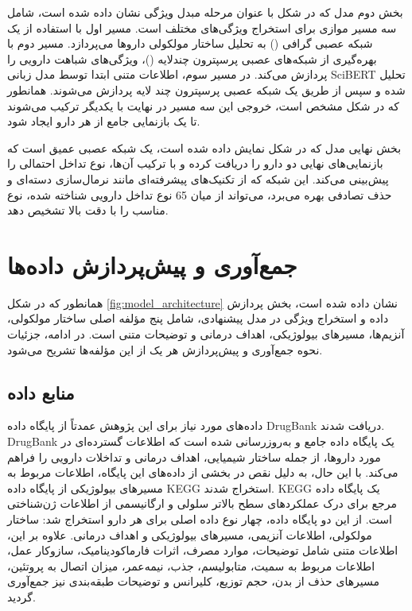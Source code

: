 بخش دوم مدل که در شکل با عنوان مرحله مبدل ویژگی نشان داده شده است، شامل سه مسیر موازی برای استخراج ویژگی‌های مختلف است. مسیر اول با استفاده از یک شبکه عصبی گرافی () به تحلیل ساختار مولکولی داروها می‌پردازد. مسیر دوم با بهره‌گیری از شبکه‌های عصبی پرسپترون چندلایه ()، ویژگی‌های شباهت دارویی را پردازش می‌کند. در مسیر سوم، اطلاعات متنی ابتدا توسط مدل زبانی SciBERT تحلیل شده و سپس از طریق یک شبکه عصبی پرسپترون چند لایه پردازش می‌شوند. همانطور که در شکل مشخص است، خروجی این سه مسیر در نهایت با یکدیگر ترکیب می‌شوند تا یک بازنمایی جامع از هر دارو ایجاد شود.

بخش نهایی مدل که در شکل نمایش داده شده است، یک شبکه عصبی عمیق است که بازنمایی‌های نهایی دو دارو را دریافت کرده و با ترکیب آن‌ها، نوع تداخل احتمالی را پیش‌بینی می‌کند. این شبکه که از تکنیک‌های پیشرفته‌ای مانند نرمال‌سازی دسته‌ای و حذف تصادفی بهره می‌برد، می‌تواند از میان 65 نوع تداخل دارویی شناخته شده، نوع مناسب را با دقت بالا تشخیص دهد.

\section{جمع‌آوری و پیش‌پردازش داده‌ها}

همانطور که در شکل \ref{fig:model_architecture} نشان داده شده است، بخش پردازش داده و استخراج ویژگی در مدل پیشنهادی، شامل پنج مؤلفه اصلی ساختار مولکولی، آنزیم‌ها، مسیرهای بیولوژیکی، اهداف درمانی و توضیحات متنی است. در ادامه، جزئیات نحوه جمع‌آوری و پیش‌پردازش هر یک از این مؤلفه‌ها تشریح می‌شود.

\subsection{منابع داده}

داده‌های مورد نیاز برای این پژوهش عمدتاً از پایگاه داده DrugBank \cite{ref_drugbank} دریافت شدند. DrugBank یک پایگاه داده جامع و به‌روزرسانی شده است که اطلاعات گسترده‌ای در مورد داروها، از جمله ساختار شیمیایی، اهداف درمانی و تداخلات دارویی را فراهم می‌کند. با این حال، به دلیل نقص در بخشی از داده‌های این پایگاه، اطلاعات مربوط به مسیرهای بیولوژیکی از پایگاه داده KEGG \cite{ref_kegg} استخراج شدند. KEGG یک پایگاه داده مرجع برای درک عملکردهای سطح بالاتر سلولی و ارگانیسمی از اطلاعات ژن‌شناختی است. از این دو پایگاه داده، چهار نوع داده اصلی برای هر دارو استخراج شد: ساختار مولکولی، اطلاعات آنزیمی، مسیرهای بیولوژیکی و اهداف درمانی. علاوه بر این، اطلاعات متنی شامل توضیحات، موارد مصرف، اثرات فارماکودینامیک، سازوکار عمل، اطلاعات مربوط به سمیت، متابولیسم، جذب، نیمه‌عمر، میزان اتصال به پروتئین، مسیرهای حذف از بدن، حجم توزیع، کلیرانس و توضیحات طبقه‌بندی نیز جمع‌آوری گردید.

